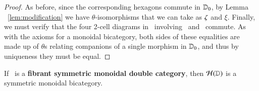 \documentclass{amsart}
\begin{document}
\begin{proof}
  As before, since the corresponding hexagons commute in $\mathbb{D}_0$, by Lemma ~\ref{lem:modification} we have $\theta$-isomorphisms that we can take as $\zeta$
  and $\xi$.  Finally, we must verify that the four 2-cell diagrams
  in~\cite[p136--139]{mccrudden:bal-coalgb} involving \ze\ and \xi\
  commute.  As with the axioms for a monoidal bicategory, both sides
  of these equalities are made up of $\theta$s relating companions of
  a single morphism in $\mathbb{D}_0$, and thus by uniqueness they must be
  equal.


\end{proof}

\begin{lem}\label{thm:sym11-symbi}
  If \lD\ is a {\bf fibrant symmetric monoidal double category}, then $\mathcal{H}(\mathbb{D})$ is a
 symmetric monoidal bicategory.  
\end{lem}
\end{document}
